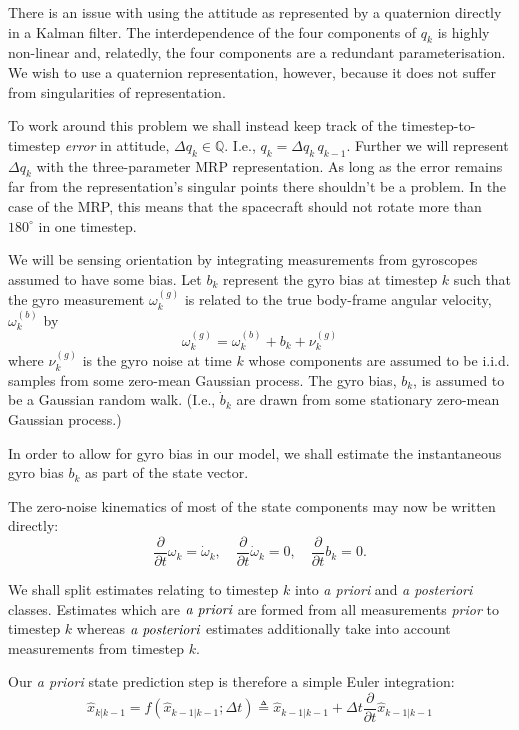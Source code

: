 \documentclass[a4paper]{paper}
\begin{document}
There is an issue with using the attitude as represented by a quaternion
directly in a Kalman filter. The interdependence of the four components of $q_k$
is highly non-linear and, relatedly, the four components are a redundant
parameterisation. We wish to use a quaternion representation, however, because
it does not suffer from singularities of representation.

To work around this problem we shall instead keep track of the
timestep-to-timestep \emph{error} in attitude, $\Delta q_k \in \mathbb{Q}$.
I.e., $q_k = \Delta q_k \, q_{k-1}$. Further we will represent $\Delta
q_k$ with the three-parameter MRP representation. As long as the error
remains far from the representation's singular points there shouldn't be a
problem. In the case of the MRP, this means that the spacecraft should not
rotate more than $180^\circ$ in one timestep.

We will be sensing orientation by integrating measurements from gyroscopes
assumed to have some bias. Let $b_k$
represent the gyro bias at timestep $k$ such that the gyro measurement
$\omega^{(g)}_k$ is related to the true body-frame angular velocity,
$\omega^{(b)}_k$ by
$$
\omega^{(g)}_k = \omega^{(b)}_k + b_k + \nu^{(g)}_k
$$
where $\nu^{(g)}_k$ is the gyro noise at time $k$ whose components are assumed
to be i.i.d. samples from some zero-mean Gaussian process. The gyro bias, $b_k$,
is assumed to be a Gaussian random walk. (I.e., $\dot{b}_k$ are drawn from some
stationary zero-mean Gaussian process.)

In order to allow for gyro bias in our model, we shall estimate the
instantaneous gyro bias $b_k$ as part of the state vector.

The zero-noise kinematics of most of the state components may now be written
directly:
$$
\frac{\partial}{\partial t} \omega_k = \dot{\omega}_k, \quad
\frac{\partial}{\partial t} \dot{\omega}_k = 0, \quad
\frac{\partial}{\partial t} b_k = 0.
$$

We shall split estimates relating to timestep $k$ into \emph{a priori} and
\emph{a posteriori} classes. Estimates which are $\emph{a priori}$ are formed
from all measurements \emph{prior} to timestep $k$ whereas $\emph{a
posteriori}$ estimates additionally take into account measurements from timestep
$k$.

Our \emph{a priori} state prediction step is therefore a simple Euler integration:
$$
\hat{x}_{k|k-1} = f\left(\hat{x}_{k-1|k-1}; \Delta t\right)
\triangleq \hat{x}_{k-1|k-1} + \Delta t \frac{\partial}{\partial t} \hat{x}_{k-1|k-1}
$$
\end{document}
